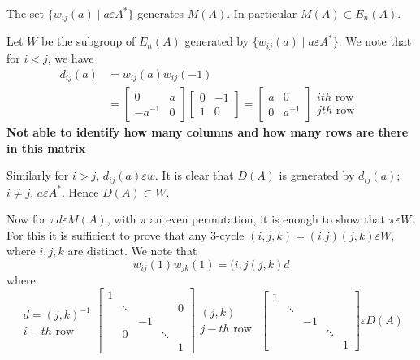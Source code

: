 \begin{lem}\label{c3:lem2.2}
The set $\{w_{ij}(a)\mid a\varepsilon A^{\ast}\}$ generates $M(A)$. In
particular $M(A)\subset E_n(A)$. 
\end{lem}

\begin{Proof}
Let $W$ be the subgroup of $E_n(A)$ generated by $\{w_{ij}(a)\mid
a\varepsilon A^{\ast}\}$. We note that for $i<j$, we have
\begin{align*}
d_{ij}(a)&=w_{ij}(a)w_{ij}(-1)\\
&=\begin{bmatrix}
0 & a\\
-a^{-1} & 0
\end{bmatrix} \begin{bmatrix}
0 & -1\\
1 & 0
\end{bmatrix} = \begin{bmatrix}
a & 0\\
0 & a^{-1}
\end{bmatrix} \begin{matrix}
ith \text{ row }\\
jth \text{ row }
\end{matrix}
\end{align*}
{\large\bf Not able to identify how many columns and how many rows are
there in this matrix}


Similarly for $i>j$, $d_{ij}(a)\varepsilon w$. It is clear that $D(A)$
is generated by $d_{ij}(a)$; $i\neq j$, $a\varepsilon A^{\ast}$. Hence
$D(A)\subset W$.

Now for $\pi d\varepsilon M(A)$, with $\pi$ an even permutation, it is
enough to show that $\pi \varepsilon W$. For this it is sufficient to
prove that any 3-cycle $(i,j,k)=(i.j)(j,k)\varepsilon W$, where
$i,j,k$ are distinct. We note that 
$$
w_{ij}(1)w_{jk}(1)=(i,j(j,k)d
$$
where 
{\fontsize{10}{12}\selectfont$$
\begin{matrix}
d=(j,k)^{-1}\\
i-th\text{ row }
\end{matrix} \begin{bmatrix}
1 & & & &\\
&\ddots & & &0\\
& & -1 & &\\
& 0 & &\ddots &\\
& & & & 1
\end{bmatrix} \begin{matrix}
(j,k)\\
j-th \text{ row }
\end{matrix} \begin{bmatrix}
1 & & & &\\
&\ddots & &&\\
& &-1 & &\\
& & &\ddots &\\
&& & &  1
\end{bmatrix} \varepsilon D(A)
$$}


\end{Proof}
